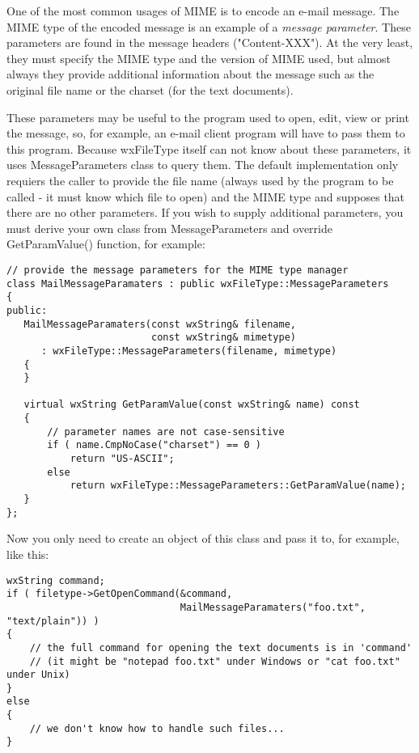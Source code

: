 
One of the most common usages of MIME is to encode an e-mail message. The MIME
type of the encoded message is an example of a {\it message parameter}. These
parameters are found in the message headers ("Content-XXX"). At the very least,
they must specify the MIME type and the version of MIME used, but almost always
they provide additional information about the message such as the original file
name or the charset (for the text documents).

These parameters may be useful to the program used to open, edit, view or print
the message, so, for example, an e-mail client program will have to pass them to
this program. Because wxFileType itself can not know about these parameters,
it uses MessageParameters class to query them. The default implementation only
requiers the caller to provide the file name (always used by the program to be
called - it must know which file to open) and the MIME type and supposes that
there are no other parameters. If you wish to supply additional parameters, you
must derive your own class from MessageParameters and override GetParamValue()
function, for example:

\begin{verbatim}
// provide the message parameters for the MIME type manager
class MailMessageParamaters : public wxFileType::MessageParameters
{
public:
   MailMessageParamaters(const wxString& filename,
                         const wxString& mimetype)
      : wxFileType::MessageParameters(filename, mimetype)
   {
   }

   virtual wxString GetParamValue(const wxString& name) const
   {
       // parameter names are not case-sensitive
       if ( name.CmpNoCase("charset") == 0 )
           return "US-ASCII";
       else
           return wxFileType::MessageParameters::GetParamValue(name);
   }
};
\end{verbatim}

Now you only need to create an object of this class and pass it to, for example,
 like this:

\begin{verbatim}
wxString command;
if ( filetype->GetOpenCommand(&command,
                              MailMessageParamaters("foo.txt", "text/plain")) )
{
    // the full command for opening the text documents is in 'command'
    // (it might be "notepad foo.txt" under Windows or "cat foo.txt" under Unix)
}
else
{
    // we don't know how to handle such files...
}

\end{verbatim}

